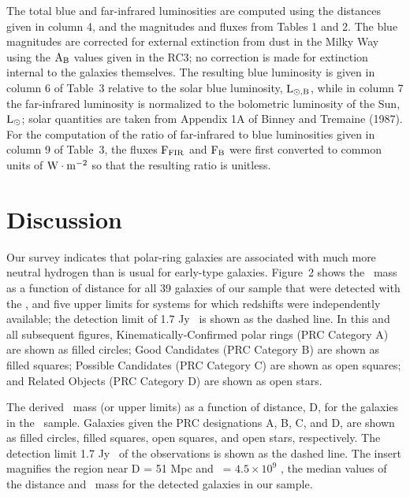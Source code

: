 The total blue and far-infrared luminosities are computed 
using the distances given in column 4, and the magnitudes and fluxes 
from Tables 1 and 2.  
The blue magnitudes are corrected for external extinction from dust in  
the Milky Way using the $\rm A_B$ values given in the RC3; 
no correction is made 
for extinction internal to the galaxies themselves.  
The resulting blue luminosity is given in column 6 of Table~3 
relative to the solar blue luminosity, $\rm L_{\rm \odot,B}$, 
while in column 7 the far-infrared luminosity is normalized to the bolometric
luminosity of the Sun, $\rm L_{\rm \odot}$; 
solar quantities are taken from Appendix 1A of Binney and Tremaine (1987). 
For the computation of the ratio of far-infrared to blue luminosities given 
in column 9 of Table~3, the fluxes $\rm F_{\rm FIR}$ and $\rm F_B$ were 
first converted to 
common units of $\rm W\cdot m^{-2}$ so that the resulting ratio is unitless.  

\vspace*{.2in}

\section{Discussion}
\medskip

Our survey indicates that polar-ring galaxies are 
associated with much more neutral hydrogen than is usual for early-type 
galaxies.  Figure~2 shows the \HI\ mass as a function of distance for 
all 39 galaxies of our sample that were detected with the , and 
five upper limits for systems for which redshifts were independently 
available; the detection limit of 1.7 Jy \CDOT \KMS\ is shown as 
the dashed line.  
In this and all subsequent figures, Kinematically-Confirmed polar rings 
(PRC Category A) are shown as filled circles; Good Candidates (PRC Category B) 
are shown as filled squares; Possible Candidates (PRC Category C) are shown 
as open squares; and Related Objects (PRC Category D) are shown as open stars.


\bigskip
\centerline{}

\medskip
{\tenpt 
   
The derived \HI\ mass (or upper limits) as a 
function of distance, D, for the galaxies in the \ sample.  Galaxies 
given the PRC designations A, B, C, and D, are shown as filled circles, 
filled squares, open squares, and open stars, respectively.  The detection 
limit 1.7 Jy \CDOT \KMS\ of the observations is shown as the dashed line.
The insert magnifies the region near D = 51 Mpc and 
\MHI\ = $4.5 \times 10^{9}$ \MSUN, 
the median values of the distance and \HI\ mass for the detected galaxies 
in our sample.
}
\bigskip

